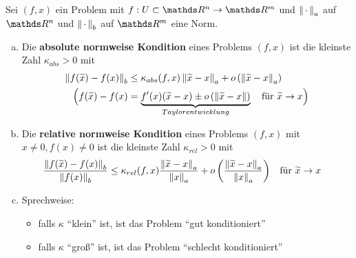 


\begin{Defe}
  Sei $(f,x)$ ein Problem mit $f:U\subset \R^n \rightarrow \R^m$
  und $\left\| \,\cdot\, \right\|_a$ auf $\R^n$ und $\left\| \,\cdot\, \right\|_b$ auf $\R^m$ eine Norm.
  \begin{enumerate}[a)]
  \item Die \textbf{absolute normweise Kondition} eines Problems $(f,x)$ ist die kleinste Zahl 
    $\kappa _{abs} > 0 $ mit
    \begin{align}
      \left\| f(\widetilde{x})-f(x) \right\|_b &\leq \kappa _{abs}(f,x) \left\| \widetilde{x}-x \right\|_a
                                     + o\left(\left\| \widetilde{x}-x \right\|_a\right) \label{III.2.2} \\\nonumber
      \Bigl(f(\widetilde{x})- f(x) 
                                   &=\underbrace{ f'(x)(\widetilde{x}-x)\pm o\left(\left\| \widetilde{x}-x \right\|\right)}_{Taylorentwicklung}
                                     \quad \text{für }\widetilde{x}\rightarrow x 
                                     \Bigr)
    \end{align}
  \item Die \textbf{relative normweise Kondition} eines Problems $(f,x)$  mit $x\neq 0, f(x) \neq 0$
    ist die kleinste Zahl 
    $\kappa _{rel} > 0 $ mit
    \begin{align}
      \frac{	\left\| f(\widetilde{x})-f(x) \right\|_b }{\left\| f(x) \right\|_b}
      &\leq \kappa _{rel}(f,x)\frac{ \left\| \widetilde{x}-x \right\|_a}{\left\| x \right\|_a}
        + 
        o\left(\frac{\left\| \widetilde{x}-x \right\|_a}{\left\| x \right\|_a}\right) \label{III.2.3}
      &&	\text{für } \widetilde{x} \rightarrow x
    \end{align}
  \item Sprechweise:
    \begin{itemize}
    \item falls $\kappa$ \enquote{klein} ist, ist das Problem \enquote{gut konditioniert}
    \item falls $\kappa$ \enquote{groß} ist, ist das Problem \enquote{schlecht konditioniert}
    \end{itemize}
  \end{enumerate}
\end{Defe}

